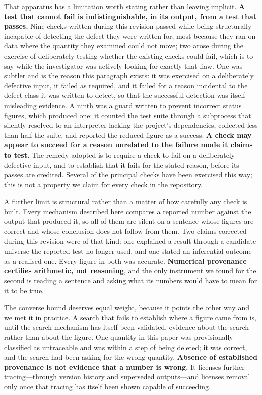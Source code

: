 \documentclass[11pt]{article}
\begin{document}
That apparatus has a limitation worth stating rather than leaving implicit. \textbf{A test that cannot fail is indistinguishable, in its output, from a test that passes.} Nine checks written during this revision passed while being structurally incapable of detecting the defect they were written for, most because they ran on data where the quantity they examined could not move; two arose during the exercise of deliberately testing whether the existing checks could fail, which is to say while the investigator was actively looking for exactly that flaw. One was subtler and is the reason this paragraph exists: it was exercised on a deliberately defective input, it failed as required, and it failed for a reason incidental to the defect class it was written to detect, so that the successful detection was itself misleading evidence. A ninth was a guard written to prevent incorrect status figures, which produced one: it counted the test suite through a subprocess that silently resolved to an interpreter lacking the project's dependencies, collected less than half the suite, and reported the reduced figure as a success. \textbf{A check may appear to succeed for a reason unrelated to the failure mode it claims to test.} The remedy adopted is to require a check to fail on a deliberately defective input, and to establish that it fails for the stated reason, before its passes are credited. Several of the principal checks have been exercised this way; this is not a property we claim for every check in the repository.

A further limit is structural rather than a matter of how carefully any check is built. Every mechanism described here compares a reported number against the output that produced it, so all of them are silent on a sentence whose figures are correct and whose conclusion does not follow from them. Two claims corrected during this revision were of that kind: one explained a result through a candidate universe the reported test no longer used, and one stated an inferential outcome as a realised one. Every figure in both was accurate. \textbf{Numerical provenance certifies arithmetic, not reasoning}, and the only instrument we found for the second is reading a sentence and asking what its numbers would have to mean for it to be true.

The converse bound deserves equal weight, because it points the other way and we met it in practice. A search that fails to establish where a figure came from is, until the search mechanism has itself been validated, evidence about the search rather than about the figure. One quantity in this paper was provisionally classified as untraceable and was within a step of being deleted; it was correct, and the search had been asking for the wrong quantity. \textbf{Absence of established provenance is not evidence that a number is wrong.} It licenses further tracing---through version history and superseded outputs---and licenses removal only once that tracing has itself been shown capable of succeeding.
\end{document}
